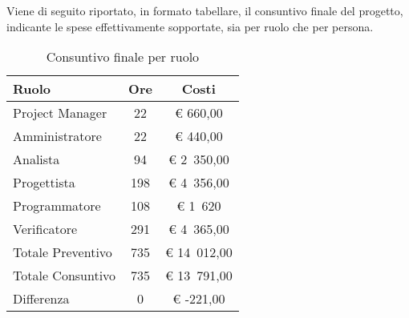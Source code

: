 
	Viene di seguito riportato, in formato tabellare, il consuntivo finale del progetto, indicante le spese effettivamente sopportate, sia per ruolo che per persona.
	
	\begin{table}[H]
				\begin{center}
					\begin{tabular}{| l | c | c |}
						\hline
						Ruolo 				& Ore 	& Costi  \\ \hline
						
						Project Manager		& 22		& \euro{} 660,00 \\
						Amministratore 		& 22	& \euro{} 440,00 	\\
						Analista			& 94		& \euro{} 2~350,00 \\
						Progettista 		& 198		& \euro{} 4~356,00  \\
						Programmatore		& 108				& \euro{} 1~620	\\
						Verificatore		& 291	& \euro{} 4~365,00	\\ \hline \hline
							
						Totale Preventivo	& 735 			& \euro{} 14~012,00 	\\ \hline
						Totale Consuntivo	& 735 			& \euro{} 13~791,00 	\\ \hline
						Differenza			& 0 			& \euro{} -221,00 	\\ \hline	
					\end{tabular}
				\end{center}
				\caption{Consuntivo finale per ruolo}
			\end{table}
	
